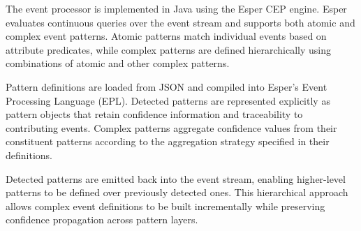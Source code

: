 The event processor is implemented in Java using the Esper CEP engine. Esper evaluates continuous queries over the event stream and supports both atomic and complex event patterns. Atomic patterns match individual events based on attribute predicates, while complex patterns are defined hierarchically using combinations of atomic and other complex patterns.

Pattern definitions are loaded from JSON and compiled into Esper’s Event Processing Language (EPL). Detected patterns are represented explicitly as pattern objects that retain confidence information and traceability to contributing events. Complex patterns aggregate confidence values from their constituent patterns according to the aggregation strategy specified in their definitions.

Detected patterns are emitted back into the event stream, enabling higher-level patterns to be defined over previously detected ones. This hierarchical approach allows complex event definitions to be built incrementally while preserving confidence propagation across pattern layers.













